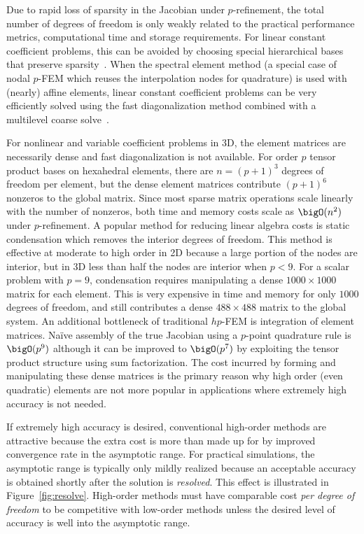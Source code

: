 Due to rapid loss of sparsity in the Jacobian under $p$-refinement, the total number of degrees of freedom is only
weakly related to the practical performance metrics, computational time and storage requirements.  For linear constant
coefficient problems, this can be avoided by choosing special hierarchical bases that preserve
sparsity~\citep{karniadakis2005she}.  When the spectral element method (a special case of nodal $p$-FEM which reuses the
interpolation nodes for quadrature) is used with (nearly) affine elements, linear constant coefficient problems can be
very efficiently solved using the fast diagonalization method combined with a multilevel coarse
solve~\citep{lottes2005hms}.

For nonlinear and variable coefficient problems in 3D, the element matrices are necessarily dense and fast
diagonalization is not available.  For order $p$ tensor product bases on hexahedral elements, there are $n = (p+1)^3$
degrees of freedom per element, but the dense element matrices contribute $(p+1)^6$ nonzeros to the global matrix.
Since most sparse matrix operations scale linearly with the number of nonzeros, both time and memory costs scale as
$\bigO(n^2)$ under $p$-refinement.  A popular method for reducing linear algebra costs is static condensation which
removes the interior degrees of freedom.  This method is effective at moderate to high order in 2D because a large
portion of the nodes are interior, but in 3D less than half the nodes are interior when $p<9$.  For a scalar problem
with $p=9$, condensation requires manipulating a dense $1000\times 1000$ matrix for each element.  This is very
expensive in time and memory for only $1000$ degrees of freedom, and still contributes a dense $488\times 488$ matrix to
the global system.  An additional bottleneck of traditional $hp$-FEM is integration of element matrices.  Na\"ive
assembly of the true Jacobian using a $p$-point quadrature rule is $\bigO(p^9)$ although it can be improved to
$\bigO(p^7)$ by exploiting the tensor product structure using sum factorization.  The cost incurred by forming and
manipulating these dense matrices is the primary reason why high order (even quadratic) elements are not more popular in
applications where extremely high accuracy is not needed.

If extremely high accuracy is desired, conventional high-order methods are attractive because the extra cost is more
than made up for by improved convergence rate in the asymptotic range.  For practical simulations, the asymptotic range
is typically only mildly realized because an acceptable accuracy is obtained shortly after the solution is
\emph{resolved}.  This effect is illustrated in Figure~\ref{fig:resolve}.  High-order methods must have comparable cost
\emph{per degree of freedom} to be competitive with low-order methods unless the desired level of accuracy is well into
the asymptotic range.

